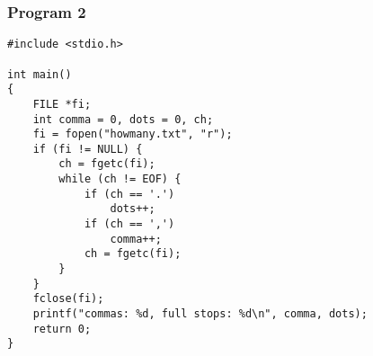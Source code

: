 \documentclass[11pt]{beamer}
\begin{document}
\begin{frame}[fragile]\frametitle{Program 2}
\label{sec-1-24}

{\scriptsize 

\begin{verbatim}
#include <stdio.h>

int main()
{
    FILE *fi;
    int comma = 0, dots = 0, ch;
    fi = fopen("howmany.txt", "r");
    if (fi != NULL) {
        ch = fgetc(fi);
        while (ch != EOF) {
            if (ch == '.')
                dots++;
            if (ch == ',')
                comma++;
            ch = fgetc(fi);
        }
    }
    fclose(fi);
    printf("commas: %d, full stops: %d\n", comma, dots);
    return 0;
}
\end{verbatim}
}
\end{frame}
\end{document}
